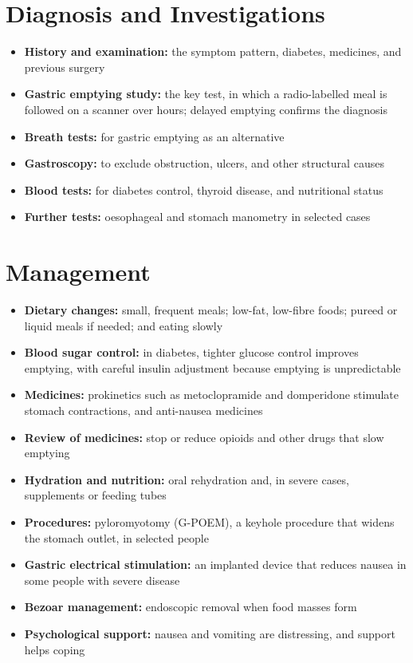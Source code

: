 \section*{Diagnosis and Investigations}
\begin{itemize}
    \item \textbf{History and examination:} the symptom pattern, diabetes, medicines, and previous surgery
    \item \textbf{Gastric emptying study:} the key test, in which a radio-labelled meal is followed on a scanner over hours; delayed emptying confirms the diagnosis
    \item \textbf{Breath tests:} for gastric emptying as an alternative
    \item \textbf{Gastroscopy:} to exclude obstruction, ulcers, and other structural causes
    \item \textbf{Blood tests:} for diabetes control, thyroid disease, and nutritional status
    \item \textbf{Further tests:} oesophageal and stomach manometry in selected cases
\end{itemize}

\section*{Management}
\begin{itemize}
    \item \textbf{Dietary changes:} small, frequent meals; low-fat, low-fibre foods; pureed or liquid meals if needed; and eating slowly
    \item \textbf{Blood sugar control:} in diabetes, tighter glucose control improves emptying, with careful insulin adjustment because emptying is unpredictable
    \item \textbf{Medicines:} prokinetics such as metoclopramide and domperidone stimulate stomach contractions, and anti-nausea medicines
    \item \textbf{Review of medicines:} stop or reduce opioids and other drugs that slow emptying
    \item \textbf{Hydration and nutrition:} oral rehydration and, in severe cases, supplements or feeding tubes
    \item \textbf{Procedures:} pyloromyotomy (G-POEM), a keyhole procedure that widens the stomach outlet, in selected people
    \item \textbf{Gastric electrical stimulation:} an implanted device that reduces nausea in some people with severe disease
    \item \textbf{Bezoar management:} endoscopic removal when food masses form
    \item \textbf{Psychological support:} nausea and vomiting are distressing, and support helps coping
\end{itemize}

